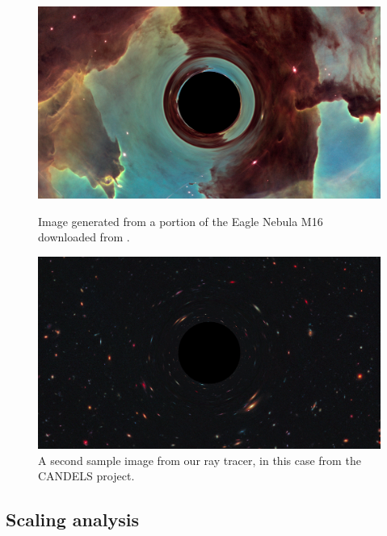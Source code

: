 \begin{figure}[h]
  \centering
 \begin{minipage}{0.48\linewidth}
  \includegraphics[width=\linewidth]{figs/eagle_render}
  \caption{Image generated from a portion of the Eagle Nebula M16 downloaded from \cite{esa-pillars}. }
  \label{fig:eagle}
 \end{minipage}
  \hspace{.01\linewidth}
 \begin{minipage}{0.48\linewidth}
  \centering
  \includegraphics[width=\linewidth]{figs/starry_render}
  \caption{A second sample image from our ray tracer,
	in this case from the CANDELS project\cite{candels-nasa_svs}.
    }
  \label{fig:starry}
 \end{minipage}
\end{figure}

\subsection{Scaling analysis}

